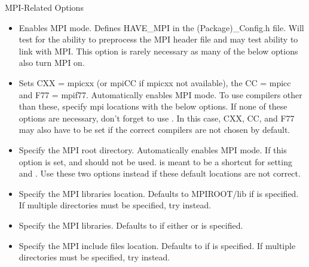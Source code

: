 \documentclass[12pt,relax]{TrilinosDevGuide}
\begin{document}
MPI-Related Options

\begin{itemize}
\item {}

Enables MPI mode. Defines HAVE\_MPI in the (Package)\_Config.h file. Will test 
for the ability to preprocess the MPI header file and may test ability to link 
with MPI.  This option is rarely necessary as many of the below options also 
turn MPI on.  

\item {}

Sets CXX = mpicxx (or mpiCC if mpicxx not available), the CC = mpicc and 
F77 = mpif77.  Automatically enables MPI mode.  To use compilers other than 
these, specify mpi locations with the below options.  If none of these options 
are necessary, don't forget to use .  In this 
case, CXX, CC, and F77 may also have to be set if the correct compilers are 
not chosen by default.

\item {}

Specify the MPI root directory. Automatically enables MPI mode.  If this 
option is set,  and 
 should not be used.  
 is meant to be a shortcut for setting 
and .  Use these two options instead if 
these default locations are not correct.

\item {}

Specify the MPI libraries location. Defaults to MPIROOT/lib if 
 is specified. If multiple directories must be 
specified, try  instead. 

\item {} 

Specify the MPI libraries. Defaults to 
 if either or 
 is specified.

\item {}

Specify the MPI include files location. Defaults to  if 
 is specified. If multiple directories  must be specified, try 
 instead.
\end{itemize}
\end{document}
